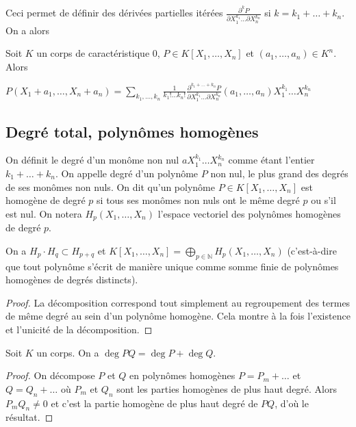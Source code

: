 Ceci permet de définir des dérivées partielles itérées $\frac{\partial^k P}{\partial X_1^{k_1}\ldots \partial X_n^{k_n}}$ si $k = k_1 + \ldots + k_n$. On a alors

\begin{thm}
Soit $K$ un corps de caractéristique 0, $P \in K[X_1,\ldots,X_n]$ et $(a_1,\ldots,a_n) \in K^n$. Alors

$P(X_1 + a_1,\ldots,X_n + a_n) = \sum_{k_1,\ldots,k_n} \frac{1}{k_1!\ldots k_n!} \frac{\partial^{k_1+\ldots+k_n} P}{\partial X_1^{k_1}\ldots \partial X_n^{k_n}} (a_1,\ldots,a_n) X_1^{k_1}\ldots X_n^{k_n}$
\end{thm}

\subsection{Degré total, polynômes homogènes}

\begin{de}
On définit le degré d'un monôme non nul $a X_1^{k_1}\ldots X_n^{k_n}$ comme étant l'entier $k_1 + \ldots + k_n$. On appelle degré d'un polynôme $P$ non nul, le plus grand des degrés de ses monômes non nuls. On dit qu'un polynôme $P \in K[X_1,\ldots,X_n]$ est homogène de degré $p$ si tous ses monômes non nuls ont le même degré $p$ ou s'il est nul. On notera $H_p(X_1,\ldots,X_n)$ l'espace vectoriel des polynômes homogènes de degré $p$.
\end{de}

\begin{thm}
On a $H_p \cdot H_q \subset H_{p+q}$ et $K[X_1,\ldots,X_n] = \bigoplus_{p\in\mathbb{N}} H_p(X_1,\ldots,X_n)$ (c'est-à-dire que tout polynôme s'écrit de manière unique comme somme finie de polynômes homogènes de degrés distincts).
\end{thm}

\begin{proof}
La décomposition correspond tout simplement au regroupement des termes de même degré au sein d'un polynôme homogène. Cela montre à la fois l'existence et l'unicité de la décomposition.
\end{proof}

\begin{thm}
Soit $K$ un corps. On a $\deg PQ = \deg P + \deg Q$.
\end{thm}

\begin{proof}
On décompose $P$ et $Q$ en polynômes homogènes $P = P_m + \ldots$ et $Q = Q_n + \ldots$ où $P_m$ et $Q_n$ sont les parties homogènes de plus haut degré. Alors $P_m Q_n \neq 0$ et c'est la partie homogène de plus haut degré de $PQ$, d'où le résultat.
\end{proof}

